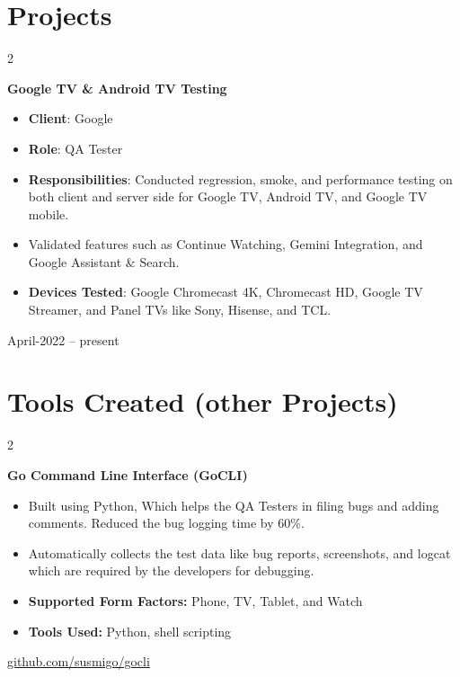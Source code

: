 \documentclass[10pt, letterpaper]{article}
\newenvironment{highlights}{
    \begin{itemize}[
        topsep=0.10 cm,
        parsep=0.10 cm,
        partopsep=0pt,
        itemsep=0pt,
        leftmargin=0.4 cm + 10pt
    ]
}{
    \end{itemize}
} %
\newenvironment{twocolentry}[2][]{
    \onecolentry
    \def\secondColumn{#2}
    \setcolumnwidth{\fill, 4.5 cm}
    \begin{paracol}{2}
}{
    \switchcolumn \raggedleft \secondColumn
    \end{paracol}
    \endonecolentry
} %
\begin{document}
    
    \section{Projects}



        
        \begin{twocolentry}{
            April-2022 -- present
        }
            \textbf{Google TV \& Android TV Testing}
            \begin{highlights}
                \item \textbf{Client}: Google
                \item \textbf{Role}: QA Tester
                \item \textbf{Responsibilities}: Conducted regression, smoke, and performance testing on both client and server side for Google TV, Android TV, and Google TV mobile.
                \item Validated features such as Continue Watching, Gemini Integration, and Google Assistant \& Search.
                \item \textbf{Devices Tested}: Google Chromecast 4K, Chromecast HD, Google TV Streamer, and Panel TVs like Sony, Hisense, and TCL.
            \end{highlights}
        \end{twocolentry}



    
    \section{Tools Created (other Projects)}



        
        \begin{twocolentry}{
            \href{https://susmigo1210.github.io/gocli_guide/}{github.com/susmigo/gocli}
        }
            \textbf{Go Command Line Interface (GoCLI)}
            \begin{highlights}
                \item Built using Python, Which helps the QA Testers in filing bugs and adding comments. Reduced the bug logging time by 60\%.
                \item Automatically collects the test data like bug reports, screenshots, and logcat which are required by the developers for debugging.
                \item \textbf{Supported Form Factors:} Phone, TV, Tablet, and Watch
                \item \textbf{Tools Used:} Python, shell scripting
            \end{highlights}
        \end{twocolentry}
\end{document}
